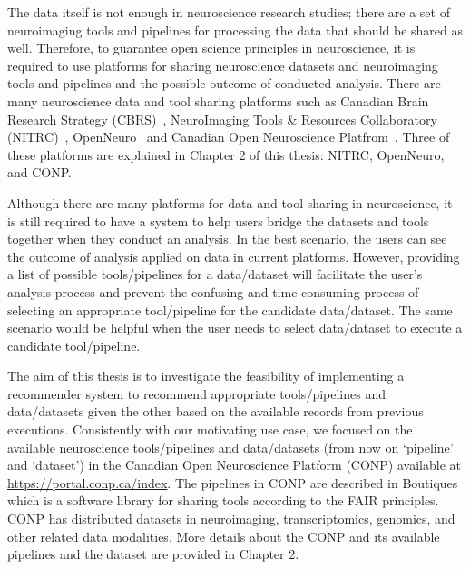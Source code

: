 
The data itself is not enough in neuroscience research studies; there are a set of neuroimaging tools and pipelines for processing the data that should be shared as well. Therefore, to guarantee open science principles in neuroscience, it is required to use platforms for sharing neuroscience datasets and neuroimaging tools and pipelines and the possible outcome of conducted analysis. There are many neuroscience data and tool sharing platforms such as Canadian Brain Research Strategy (CBRS)~\cite{CBRS}, NeuroImaging Tools \& Resources Collaboratory (NITRC)~\cite{nitrc}, OpenNeuro~\cite{markiewicz2021openneuro} and Canadian Open Neuroscience Platfrom~\cite{conp}. Three of these platforms are explained in Chapter 2 of this thesis: NITRC, OpenNeuro, and CONP.



Although there are many platforms for data and tool sharing in neuroscience, it is still required to have a system to help users bridge the datasets and tools together when they conduct an analysis. In the best scenario, the users can see the outcome of analysis applied on data in current platforms. However, providing a list of possible tools/pipelines for a data/dataset will facilitate the user's analysis process and prevent the confusing and time-consuming process of selecting an appropriate tool/pipeline for the candidate data/dataset. The same scenario would be helpful when the user needs to select data/dataset to execute a candidate tool/pipeline.

The aim of this thesis is to investigate the feasibility of implementing a recommender system to recommend appropriate tools/pipelines and data/datasets given the other based on the available records from previous executions. Consistently with our motivating use case, we focused on the available neuroscience tools/pipelines and data/datasets (from now on `pipeline' and `dataset') in the Canadian Open Neuroscience Platform (CONP) available at \url{https://portal.conp.ca/index}. The pipelines in CONP are described in Boutiques~\cite{glatard2018boutiques} which is a software library for sharing tools according to the FAIR principles. CONP has distributed datasets in neuroimaging, transcriptomics, genomics, and other related data modalities. More details about the CONP and its available pipelines and the dataset are provided in Chapter 2.



